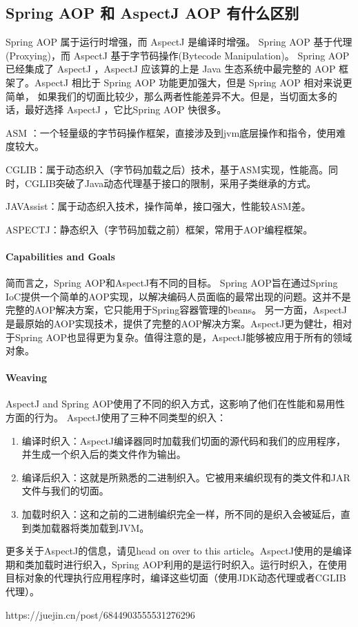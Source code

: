 \documentclass[../../../interview-questions.tex]{subfiles}
\begin{document}
\subsection{Spring AOP 和 AspectJ AOP 有什么区别}

Spring AOP 属于运行时增强，而 AspectJ 是编译时增强。 Spring AOP 基于代理(Proxying)，而 AspectJ 基于字节码操作(Bytecode Manipulation)。
Spring AOP 已经集成了 AspectJ  ，AspectJ  应该算的上是 Java 生态系统中最完整的 AOP 框架了。AspectJ  相比于 Spring AOP 功能更加强大，但是 Spring AOP 相对来说更简单，
如果我们的切面比较少，那么两者性能差异不大。但是，当切面太多的话，最好选择 AspectJ ，它比Spring AOP 快很多。


ASM ：一个轻量级的字节码操作框架，直接涉及到jvm底层操作和指令，使用难度较大。

CGLIB：属于动态织入（字节码加载之后）技术，基于ASM实现，性能高。同时，CGLIB突破了Java动态代理基于接口的限制，采用子类继承的方式。

JAVAssist：属于动态织入技术，操作简单，接口强大，性能较ASM差。

ASPECTJ：静态织入（字节码加载之前）框架，常用于AOP编程框架。

\paragraph{Capabilities and Goals}

简而言之，Spring AOP和AspectJ有不同的目标。
Spring AOP旨在通过Spring IoC提供一个简单的AOP实现，以解决编码人员面临的最常出现的问题。这并不是完整的AOP解决方案，它只能用于Spring容器管理的beans。
另一方面，AspectJ是最原始的AOP实现技术，提供了完整的AOP解决方案。AspectJ更为健壮，相对于Spring AOP也显得更为复杂。值得注意的是，AspectJ能够被应用于所有的领域对象。

\paragraph{Weaving}

AspectJ and Spring AOP使用了不同的织入方式，这影响了他们在性能和易用性方面的行为。
AspectJ使用了三种不同类型的织入：

\begin{enumerate}
    \item {编译时织入：AspectJ编译器同时加载我们切面的源代码和我们的应用程序，并生成一个织入后的类文件作为输出。}
    \item {编译后织入：这就是所熟悉的二进制织入。它被用来编织现有的类文件和JAR文件与我们的切面。}
    \item {加载时织入：这和之前的二进制编织完全一样，所不同的是织入会被延后，直到类加载器将类加载到JVM。}
\end{enumerate}

更多关于AspectJ的信息，请见head on over to this article。AspectJ使用的是编译期和类加载时进行织入，Spring AOP利用的是运行时织入。运行时织入，在使用目标对象的代理执行应用程序时，编译这些切面（使用JDK动态代理或者CGLIB代理）。

https://juejin.cn/post/6844903555531276296
\end{document}
